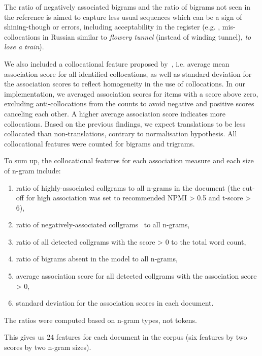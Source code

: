 The ratio of negatively associated bigrams and the ratio of bigrams not seen in the reference is aimed to capture less usual sequences which can be a sign of shining-though or errors, including acceptability in the register (e.g. , mis-collocations in Russian similar to \textit{flowery tunnel} (instead of winding tunnel), \textit{to lose a train}).

We also included a collocational feature proposed by~\citet{Volansky2011}, i.e. average mean association score for all identified collocations, as well as standard deviation for the association scores to reflect homogeneity in the use of collocations. In our implementation, we averaged association scores for items with a score above zero, excluding anti-collocations from the counts to avoid negative and positive scores canceling each other. A higher average association score indicates more collocations. 
Based on the previous findings, we expect translations to be less collocated than non-translations, contrary to normalisation hypothesis. All collocational features were counted for bigrams and trigrams.

To sum up, the collocational features for each association measure and each size of n-gram include: 

\label{pg:collgrams}
\begin{enumerate}\compresslist{}
	\item ratio of highly-associated collgrams to all n-grams in the document (the cut-off for high association was set to recommended \gls{NPMI} > 0.5 and t-score > 6),
	\item ratio of negatively-associated collgrams~\cite[anti-collocations,][]{Evert2009} to all n-grams,
	\item ratio of all detected collgrams with the score > 0 to the total word count,
	\item ratio of bigrams absent in the model to all n-grams,
	\item average association score for all detected collgrams with the association score > 0,
	\item standard deviation for the association scores in each document.
\end{enumerate}

The ratios were computed based on n-gram types, not tokens. 

This gives us 24 features for each document in the corpus (six features by two scores by two n-gram sizes).

